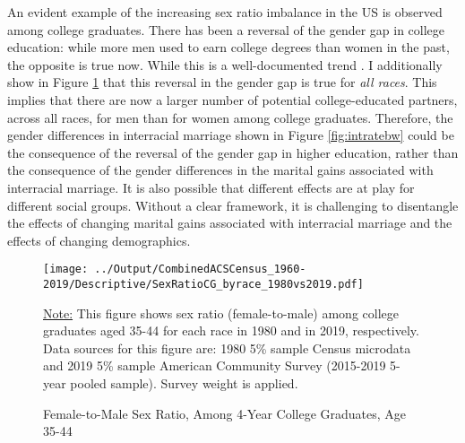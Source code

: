 An evident example of the increasing sex ratio imbalance in the US is observed among college graduates. There has been a reversal of the gender gap in college education: while more men used to earn college degrees than women in the past, the opposite is true now. While this is a well-documented trend \citep{GoldinKatzKuziemko_2006_GenderGapCollege, ChiapporiIyigunWeiss_2009_SchoolingMarriageMarket, ChuanZhang_2022_GenderGapCollege}. I additionally show in Figure \ref{fig:sexratiocg} that this reversal in the gender gap is true for \textit{all races}. This implies that there are now a larger number of potential college-educated partners, across all races, for men than for women among college graduates. Therefore, the gender differences in interracial marriage shown in Figure \ref{fig:intratebw} could be the consequence of the reversal of the gender gap in higher education, rather than the consequence of the gender differences in the marital gains associated with interracial marriage. It is also possible that different effects are at play for different social groups. Without a clear framework, it is challenging to disentangle the effects of changing marital gains associated with interracial marriage and the effects of changing demographics. 




\begin{figure}[H] \caption{Female-to-Male Sex Ratio, Among 4-Year College Graduates, Age 35-44} \label{fig:sexratiocg}
	 \texttt{[image: ../Output/CombinedACSCensus\_1960-2019/Descriptive/SexRatioCG\_byrace\_1980vs2019.pdf]}
\begin{fignote}
	\underline{Note:} This figure shows sex ratio (female-to-male) among college graduates aged 35-44 for each race in 1980 and in 2019, respectively. Data sources for this figure are: 1980 5\% sample Census microdata and 2019 5\% sample American Community Survey (2015-2019 5-year pooled sample). Survey weight is applied. 
\end{fignote}
\end{figure}


